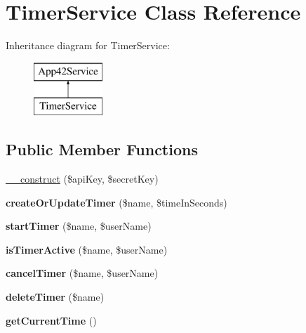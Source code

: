 \hypertarget{class_timer_service}{\section{Timer\+Service Class Reference}
\label{class_timer_service}
}
Inheritance diagram for Timer\+Service\+:\begin{figure}[H]
\begin{center}
\leavevmode
\includegraphics[height=2.000000cm]{class_timer_service}
\end{center}
\end{figure}
\subsection*{Public Member Functions}
\begin{DoxyCompactItemize}
\item 
\hyperlink{class_timer_service_a49f2ad222e06420736d750e167d55d7c}{\+\_\+\+\_\+construct} (\$api\+Key, \$secret\+Key)
\item 
\hypertarget{class_timer_service_ab557bdb57b266c0f45b433b4f570f70d}{{\bfseries create\+Or\+Update\+Timer} (\$name, \$time\+In\+Seconds)}\label{class_timer_service_ab557bdb57b266c0f45b433b4f570f70d}

\item 
\hypertarget{class_timer_service_a6c156a0977321b1eef67497911da7882}{{\bfseries start\+Timer} (\$name, \$user\+Name)}\label{class_timer_service_a6c156a0977321b1eef67497911da7882}

\item 
\hypertarget{class_timer_service_a07423fec85a8490a9aa6e2a178e77a8a}{{\bfseries is\+Timer\+Active} (\$name, \$user\+Name)}\label{class_timer_service_a07423fec85a8490a9aa6e2a178e77a8a}

\item 
\hypertarget{class_timer_service_ad84a25929942e1641dfb797cc500cac7}{{\bfseries cancel\+Timer} (\$name, \$user\+Name)}\label{class_timer_service_ad84a25929942e1641dfb797cc500cac7}

\item 
\hypertarget{class_timer_service_ac083534d8a6baed6a9084b07ce9a78fd}{{\bfseries delete\+Timer} (\$name)}\label{class_timer_service_ac083534d8a6baed6a9084b07ce9a78fd}

\item 
\hypertarget{class_timer_service_a67ef180ed8d69dc63dacd27f4a418edd}{{\bfseries get\+Current\+Time} ()}\label{class_timer_service_a67ef180ed8d69dc63dacd27f4a418edd}

\end{DoxyCompactItemize}
